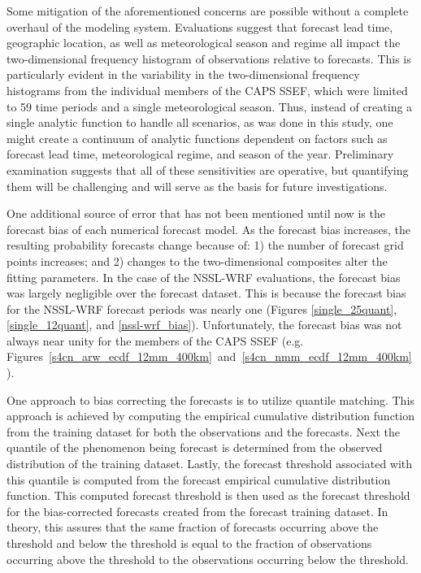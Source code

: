 Some mitigation of the aforementioned concerns are possible without a complete overhaul of the modeling system.
Evaluations suggest that forecast lead time, geographic location, as well as meteorological season and regime all impact the two-dimensional frequency histogram of observations relative to forecasts.
This is particularly evident in the variability in the two-dimensional frequency histograms from the individual members of the CAPS SSEF, which were limited to 59 time periods and a single meteorological season.
Thus, instead of creating a single analytic function to handle all scenarios, as was done in this study, one might create a continuum of analytic functions dependent on factors such as forecast lead time, meteorological regime, and season of the year.
Preliminary examination suggests that all of these sensitivities are operative, but quantifying them will be challenging and will serve as the basis for future investigations.


One additional source of error that has not been mentioned until now is the forecast bias of each numerical forecast model.
As the forecast bias increases, the resulting probability forecasts change because of: 1) the number of forecast grid points increases; and 2) changes to the two-dimensional composites alter the fitting parameters.
In the case of the NSSL-WRF evaluations, the forecast bias was largely negligible over the forecast dataset.
This is because the forecast bias for the NSSL-WRF forecast periods was nearly one (Figures \ref{single_25quant}, \ref{single_12quant}, and \ref{nssl-wrf_bias}).
Unfortunately, the forecast bias was not always near unity for the members of the CAPS SSEF (e.g. \mbox{Figures \ref{s4cn_arw_ecdf_12mm_400km} and \ref{s4cn_nmm_ecdf_12mm_400km}}).


One approach to bias correcting the forecasts is to utilize quantile matching.
This approach is achieved by computing the empirical cumulative distribution function from the training dataset for both the observations and the forecasts.
Next the quantile of the phenomenon being forecast is determined from the observed distribution of the training dataset.
Lastly, the forecast threshold associated with this quantile is computed from the forecast empirical cumulative distribution function.
This computed forecast threshold is then used as the forecast threshold for the bias-corrected forecasts created from the forecast training dataset.
In theory, this assures that the same fraction of forecasts occurring above the threshold and below the threshold is equal to the fraction of observations occurring above the threshold to the observations occurring below the threshold.


